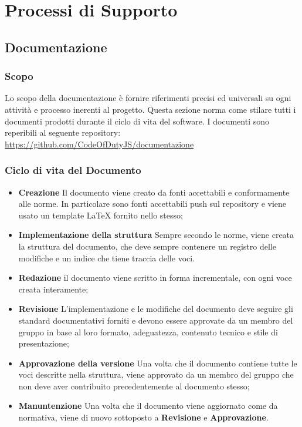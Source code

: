 \section{Processi di Supporto}
	\subsection{Documentazione}
	    
	    \subsubsection{Scopo}
	    Lo scopo della documentazione è fornire riferimenti precisi ed universali su ogni attività e processo inerenti al progetto. Questa sezione norma come stilare tutti i documenti prodotti durante il ciclo di vita del software. I documenti sono reperibili al seguente repository\glo{}:
	    \url{https://github.com/CodeOfDutyJS/documentazione}
	    
	    \subsubsection{Ciclo di vita del Documento}
	    \begin{itemize}
	        \item \textbf{Creazione} Il documento viene creato da fonti accettabili e conformamente alle norme. In particolare sono fonti accettabili push sul repository e viene usato un template LaTeX fornito nello stesso;
	        \item \textbf{Implementazione della struttura} Sempre secondo le norme, viene creata la struttura del documento, che deve sempre contenere un registro delle modifiche e un indice che tiene traccia delle voci.
	        \item \textbf{Redazione} il documento viene scritto in forma incrementale, con ogni voce creata interamente;
	        \item \textbf{Revisione} L'implementazione e le modifiche del documento deve seguire gli standard documentativi forniti e devono essere approvate da un membro del gruppo in base al loro formato, adeguatezza, contenuto tecnico e stile di presentazione;
	        \item \textbf{Approvazione della versione} Una volta che il documento contiene tutte le voci descritte nella struttura, viene approvato da un membro del gruppo che non deve aver contribuito precedentemente al documento stesso;
	        \item \textbf{Manuntenzione} Una volta che il documento viene aggiornato come da normativa, viene di nuovo sottoposto a \textbf{Revisione} e \textbf{Approvazione}.
	    \end{itemize}
	    
